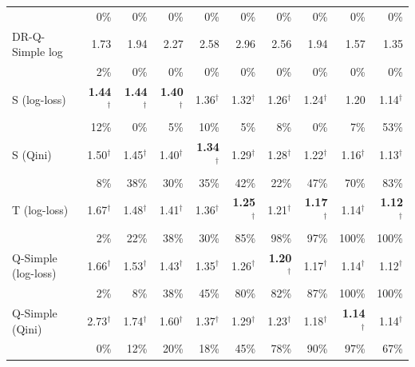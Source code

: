 \documentclass{article}
\begin{document}
\begin{table}[H]
\begin{tabular}{l|rrrrrrrrr}
 & \scriptsize 0\% & \scriptsize 0\% & \scriptsize 0\% & \scriptsize 0\% & \scriptsize 0\% & \scriptsize 0\% & \scriptsize 0\% & \scriptsize 0\% & \scriptsize 0\% \\[2pt]
DR-Q-Simple log & 1.73 & 1.94 & 2.27 & 2.58 & 2.96 & 2.56 & 1.94 & 1.57 & 1.35 \\
 & \scriptsize 2\% & \scriptsize 0\% & \scriptsize 0\% & \scriptsize 0\% & \scriptsize 0\% & \scriptsize 0\% & \scriptsize 0\% & \scriptsize 0\% & \scriptsize 0\% \\[2pt]
\hline
S (log-loss) & \textbf{1.44}$^\dagger$ & \textbf{1.44}$^\dagger$ & \textbf{1.40}$^\dagger$ & 1.36$^\dagger$ & 1.32$^\dagger$ & 1.26$^\dagger$ & 1.24$^\dagger$ & 1.20 & 1.14$^\dagger$ \\
 & \scriptsize 12\% & \scriptsize 0\% & \scriptsize 5\% & \scriptsize 10\% & \scriptsize 5\% & \scriptsize 8\% & \scriptsize 0\% & \scriptsize 7\% & \scriptsize 53\% \\[2pt]
S (Qini) & 1.50$^\dagger$ & 1.45$^\dagger$ & 1.40$^\dagger$ & \textbf{1.34}$^\dagger$ & 1.29$^\dagger$ & 1.28$^\dagger$ & 1.22$^\dagger$ & 1.16$^\dagger$ & 1.13$^\dagger$ \\
 & \scriptsize 8\% & \scriptsize 38\% & \scriptsize 30\% & \scriptsize 35\% & \scriptsize 42\% & \scriptsize 22\% & \scriptsize 47\% & \scriptsize 70\% & \scriptsize 83\% \\[2pt]
T (log-loss) & 1.67$^\dagger$ & 1.48$^\dagger$ & 1.41$^\dagger$ & 1.36$^\dagger$ & \textbf{1.25}$^\dagger$ & 1.21$^\dagger$ & \textbf{1.17}$^\dagger$ & 1.14$^\dagger$ & \textbf{1.12}$^\dagger$ \\
 & \scriptsize 2\% & \scriptsize 22\% & \scriptsize 38\% & \scriptsize 30\% & \scriptsize 85\% & \scriptsize 98\% & \scriptsize 97\% & \scriptsize 100\% & \scriptsize 100\% \\[2pt]
Q-Simple (log-loss) & 1.66$^\dagger$ & 1.53$^\dagger$ & 1.43$^\dagger$ & 1.35$^\dagger$ & 1.26$^\dagger$ & \textbf{1.20}$^\dagger$ & 1.17$^\dagger$ & 1.14$^\dagger$ & 1.12$^\dagger$ \\
 & \scriptsize 2\% & \scriptsize 8\% & \scriptsize 38\% & \scriptsize 45\% & \scriptsize 80\% & \scriptsize 82\% & \scriptsize 87\% & \scriptsize 100\% & \scriptsize 100\% \\[2pt]
Q-Simple (Qini) & 2.73$^\dagger$ & 1.74$^\dagger$ & 1.60$^\dagger$ & 1.37$^\dagger$ & 1.29$^\dagger$ & 1.23$^\dagger$ & 1.18$^\dagger$ & \textbf{1.14}$^\dagger$ & 1.14$^\dagger$ \\
 & \scriptsize 0\% & \scriptsize 12\% & \scriptsize 20\% & \scriptsize 18\% & \scriptsize 45\% & \scriptsize 78\% & \scriptsize 90\% & \scriptsize 97\% & \scriptsize 67\% \\[2pt]
\hline
\end{tabular}
\end{table}
\end{document}
